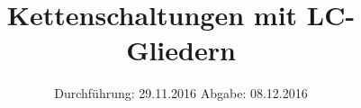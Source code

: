 

\subject{V356}
\title{Kettenschaltungen mit LC-Gliedern}
\date{
	Durchführung: 29.11.2016
	\hspace{4em}
	Abgabe: 08.12.2016
}


	\maketitle
	\newpage
	\tableofcontents
	\newpage
	
	
	
	
	
	\newpage
	
	\printbibliography

